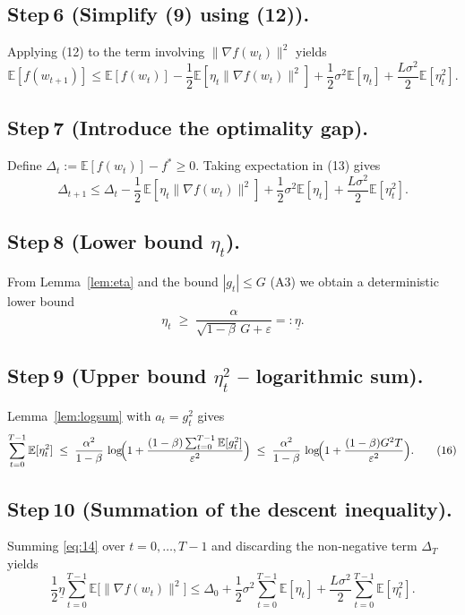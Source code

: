 \documentclass[11pt]{article}
\newcommand{\E}{\mathbb{E}}
\begin{document}
\subsection*{Step 6 (Simplify (9) using (12)).}
Applying (12) to the term involving $\|\nabla f(w_t)\|^{2}$ yields
\[
\E[f(w_{t+1})]
\le \E[f(w_t)]
   -\frac12\E[\eta_t\|\nabla f(w_t)\|^{2}]
   +\frac12\sigma^{2}\E[\eta_t]
   +\frac{L\sigma^{2}}{2}\E[\eta_t^{2}]. \tag{13}
\]

\subsection*{Step 7 (Introduce the optimality gap).}
Define $\Delta_t:=\E[f(w_t)]-f^{*}\ge0$.  Taking expectation in (13) gives
\[
\Delta_{t+1}
\le \Delta_{t}
-\frac12\,\E[\eta_t\|\nabla f(w_t)\|^{2}]
+\frac12\sigma^{2}\E[\eta_t]
+\frac{L\sigma^{2}}{2}\E[\eta_t^{2}]. \tag{14}
\]

\subsection*{Step 8 (Lower bound $\eta_t$).}
From Lemma~\ref{lem:eta} and the bound $|g_t|\le G$ (A3) we obtain a deterministic
lower bound
\[
\eta_t\;\ge\;\frac{\alpha}{\sqrt{1-\beta}\,G+\varepsilon}
=: \underline\eta . \tag{15}
\]

\subsection*{Step 9 (Upper bound $\eta_t^{2}$ – logarithmic sum).}
Lemma~\ref{lem:logsum} with $a_t=g_t^{2}$ gives
\[
\sum_{t=0}^{T-1}\E[\eta_t^{2}]
\;\le\;
\frac{\alpha^{2}}{1-\beta}\,
\log\!\Bigl(1+\frac{(1-\beta)\sum_{t=0}^{T-1}\E[g_t^{2}]}{\varepsilon^{2}}\Bigr)
\;\le\;
\frac{\alpha^{2}}{1-\beta}\,
\log\!\Bigl(1+\frac{(1-\beta)G^{2}T}{\varepsilon^{2}}\Bigr). \tag{16}
\]

\subsection*{Step 10 (Summation of the descent inequality).}
Summing \eqref{eq:14} over $t=0,\dots,T-1$ and discarding the non‑negative term $\Delta_T$ yields
\[
\frac12\underline\eta\sum_{t=0}^{T-1}\E\!\big[\|\nabla f(w_t)\|^{2}\big]
\le \Delta_{0}
+\frac12\sigma^{2}\sum_{t=0}^{T-1}\E[\eta_t]
+\frac{L\sigma^{2}}{2}\sum_{t=0}^{T-1}\E[\eta_t^{2}]. \tag{17}
\]
\end{document}

